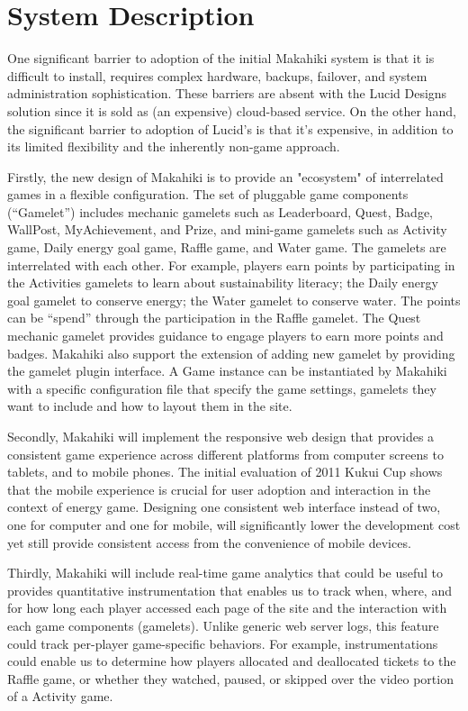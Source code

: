 \documentclass{acm_proc_article-sp}
\begin{document}
\section{System Description}

One significant barrier to adoption of the initial Makahiki system is that it is difficult to install, requires complex hardware, backups, failover, and system administration sophistication. These barriers are absent with the Lucid Designs solution since it is sold as (an expensive) cloud-based service. On the other hand, the significant barrier to adoption of Lucid's is that it's expensive, in addition to its limited flexibility and the inherently non-game approach.

Firstly, the new design of Makahiki is to provide an "ecosystem" of interrelated games in a flexible configuration. The set of pluggable game components (``Gamelet'') includes mechanic gamelets such as Leaderboard, Quest, Badge, WallPost, MyAchievement, and Prize, and mini-game gamelets such as Activity game, Daily energy goal game, Raffle game, and Water game. The gamelets are interrelated with each other. For example, players earn points by participating in the Activities gamelets to learn about sustainability literacy; the Daily energy goal gamelet to conserve energy; the Water gamelet to conserve water. The points can be ``spend'' through the participation in the Raffle gamelet. The Quest mechanic gamelet provides guidance to engage players to earn more points and badges. Makahiki also support the extension of adding new gamelet by providing the gamelet plugin interface. A Game instance can be instantiated by Makahiki with a specific configuration file that specify the game settings, gamelets they want to include and how to layout them in the site.

Secondly, Makahiki will implement the responsive web design that provides a consistent game experience across different platforms from computer screens to tablets, and to mobile phones. The  initial evaluation of 2011 Kukui Cup shows that the mobile experience is crucial for user adoption and interaction in the context of energy game. Designing one consistent web interface instead of two, one for computer and one for mobile, will significantly lower the development cost yet still provide consistent access from the convenience of mobile devices. 

Thirdly, Makahiki will include real-time game analytics that could be useful to provides quantitative instrumentation that enables us to track when, where, and for how long each player accessed each page of the site and the interaction with each game components (gamelets).  Unlike generic web server logs, this feature could track per-player game-specific behaviors. For example, instrumentations could enable us to determine how players allocated and deallocated tickets to the Raffle game, or whether they watched, paused, or skipped over the video portion of a Activity game.
\end{document}
